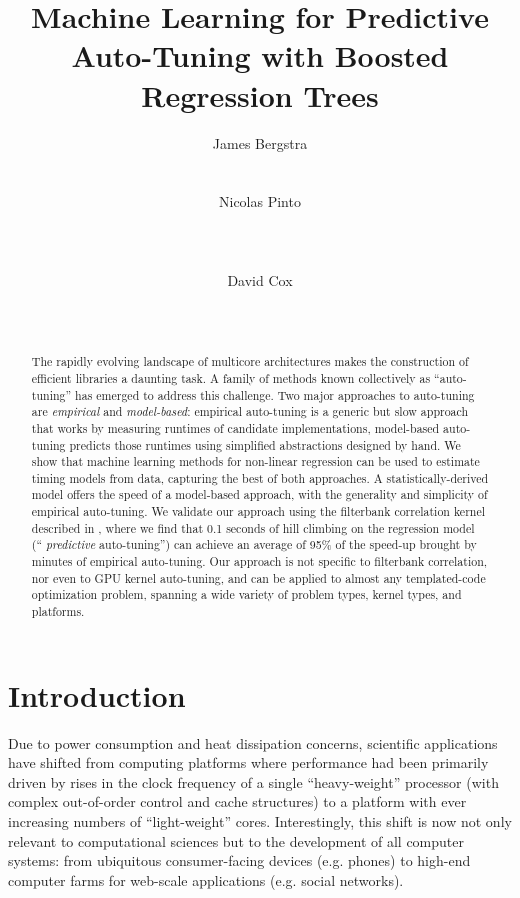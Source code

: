 \documentclass{sig-alternate}
\title{Machine Learning for Predictive Auto-Tuning with Boosted Regression Trees}
\author{
\alignauthor James Bergstra\\
\affaddr{\small{Rowland Institute at Harvard}}\\
\affaddr{\small{Cambridge MA, US}}\\
\email{\emph{\small{bergstra@rowland.harvard.edu}}}
\alignauthor Nicolas Pinto\\
\affaddr{\small{Rowland Institute at Harvard}}\\
\affaddr{\small{McGovern Institute at MIT}}\\
\affaddr{\small{Cambridge MA, USA}}\\
\email{\emph{\small{pinto@rowland.harvard.edu}}}
\alignauthor David Cox\\
\affaddr{\small{Rowland Institute at Harvard}}\\
\affaddr{\small{Cambridge MA, USA}}\\
\email{\emph{\small{cox@harvard.rowland.edu}}}
}
\begin{document}
\maketitle

\begin{abstract}

The rapidly evolving landscape of multicore architectures makes
the construction of efficient libraries a daunting task.
A family of methods known collectively as ``auto-tuning'' has emerged to
address this challenge.  Two major approaches to auto-tuning are
{\em empirical} and {\em model-based}:
empirical auto-tuning is a generic but slow approach that works by measuring runtimes of
candidate implementations, model-based auto-tuning predicts those runtimes using simplified abstractions designed by hand.
We show that machine learning methods for non-linear regression can be used
to estimate timing models from data, capturing the best of both approaches.
A statistically-derived model offers the speed of a model-based approach,
with the generality and simplicity of empirical auto-tuning.
We validate our approach using the filterbank
correlation kernel described in \citet{pinto+cox:2011gcg}, where we find that
0.1 seconds of hill climbing on the regression model (``{\em
predictive} auto-tuning'') can achieve an average of 95\% of the
speed-up brought by minutes of empirical auto-tuning.  Our approach is not
specific to filterbank correlation, nor even to GPU kernel auto-tuning, and can
be applied to almost any templated-code optimization problem, spanning a wide
variety of problem types, kernel types, and platforms.

\end{abstract}


\section{Introduction}



Due to power consumption and heat dissipation concerns, scientific applications
have shifted from computing platforms where performance had been primarily
driven by rises in the clock frequency of a single ``heavy-weight'' processor
(with complex out-of-order control and cache structures) to a platform with
ever increasing numbers of ``light-weight'' cores. Interestingly, this shift is
now not only relevant to computational sciences but to the development of all
computer systems: from ubiquitous consumer-facing devices (e.g. phones) to
high-end computer farms for web-scale applications (e.g. social networks).
\end{document}
